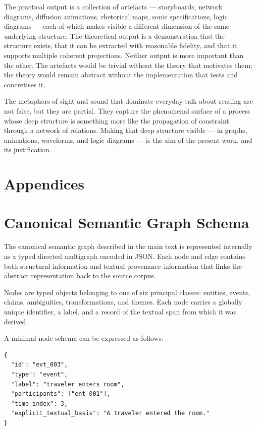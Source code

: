 \documentclass[12pt, a4paper]{article}
\begin{document}
The practical output is a collection of artefacts — storyboards, network diagrams, diffusion animations, rhetorical maps, sonic specifications, logic diagrams — each of which makes visible a different dimension of the same underlying structure. The theoretical output is a demonstration that the structure exists, that it can be extracted with reasonable fidelity, and that it supports multiple coherent projections. Neither output is more important than the other. The artefacts would be trivial without the theory that motivates them; the theory would remain abstract without the implementation that tests and concretises it.

The metaphors of sight and sound that dominate everyday talk about reading are not false, but they are partial. They capture the phenomenal surface of a process whose deep structure is something more like the propagation of constraint through a network of relations. Making that deep structure visible — in graphs, animations, waveforms, and logic diagrams — is the aim of the present work, and its justification.

\newpage
\section*{Appendices}

\appendix

\section{Canonical Semantic Graph Schema}

The canonical semantic graph described in the main text is represented internally as a typed directed multigraph encoded in JSON. Each node and edge contains both structural information and textual provenance information that links the abstract representation back to the source corpus.

Nodes are typed objects belonging to one of six principal classes: entities, events, claims, ambiguities, transformations, and themes. Each node carries a globally unique identifier, a label, and a record of the textual span from which it was derived.

A minimal node schema can be expressed as follows:

\begin{verbatim}
{
  "id": "evt_003",
  "type": "event",
  "label": "traveler enters room",
  "participants": ["ent_001"],
  "time_index": 3,
  "explicit_textual_basis": "A traveler entered the room."
}
\end{verbatim}
\end{document}
